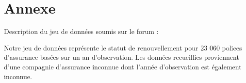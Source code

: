\documentclass[
]{article}
\begin{document}
\newpage

\hypertarget{annexe}{%
\section{Annexe}\label{annexe}}

Description du jeu de données soumis sur le forum :

Notre jeu de données représente le statut de renouvellement pour 23 060
polices d'assurance basées sur un an d'observation. Les données
recueillies proviennent d'une compagnie d'assurance inconnue dont
l'année d'observation est également inconnue.
\end{document}
